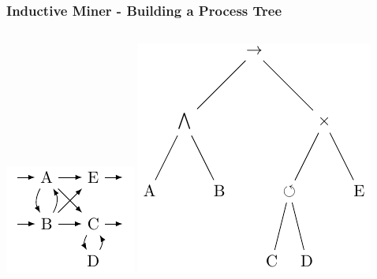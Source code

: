\documentclass{beamer}
\begin{document}
\begin{frame}
\frametitle{Inductive Miner - Building a Process Tree}
\begin{columns}
\includegraphics[width=0.8\linewidth]{img/dfgraphExample.pdf}
\includegraphics[width=0.8\linewidth]{img/xor_tree_final.pdf}
\end{columns}
\end{frame}
\end{document}
